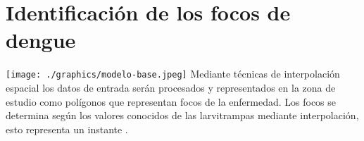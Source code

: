 

\section{Identificación de los focos de dengue}
\label{sec:solucion-instantanea}
\texttt{[image: ./graphics/modelo-base.jpeg]}
Mediante técnicas de interpolación espacial los datos de entrada serán
procesados y representados en la zona de estudio como polígonos que representan focos de la enfermedad.
Los focos se determina según los valores conocidos de las larvitrampas mediante interpolación, esto representa un instante \cite{AnusuyaSpeech20097}.
